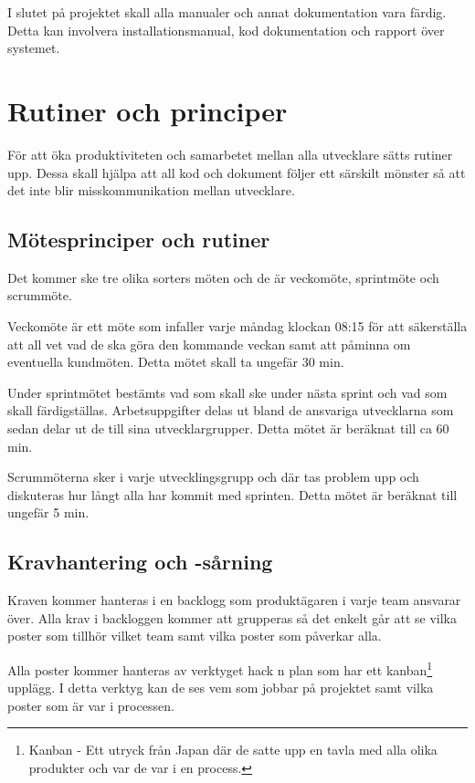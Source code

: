 \documentclass[a4paper,12pt,oneside,final]{extbook}
\begin{document}
 I slutet på projektet skall alla manualer och annat dokumentation vara färdig. Detta kan involvera installationsmanual, kod dokumentation och rapport över systemet.


\chapter{Rutiner och principer}

För att öka produktiviteten och samarbetet mellan alla utvecklare sätts rutiner upp. Dessa skall hjälpa att all kod och dokument följer ett särskilt mönster så att det inte blir misskommunikation mellan utvecklare.

\section{Mötesprinciper och rutiner}

Det kommer ske tre olika sorters möten och de är veckomöte, sprintmöte och scrummöte.  

Veckomöte är ett möte som infaller varje måndag klockan 08:15 för att säkerställa att all vet vad de ska göra den kommande veckan samt att påminna om eventuella kundmöten. Detta mötet skall ta ungefär 30 min.

Under sprintmötet bestämts vad som skall ske under nästa sprint och vad som skall färdigställas. Arbetsuppgifter delas ut bland de ansvariga utvecklarna som sedan delar ut de till sina utvecklargrupper. Detta mötet är beräknat till ca 60 min.

Scrummöterna sker i varje utvecklingsgrupp och där tas problem upp och diskuteras hur långt alla har kommit med sprinten.  Detta mötet är beräknat till ungefär 5 min.

\section{Kravhantering och -sårning}
Kraven kommer hanteras i en backlogg som produktägaren i varje team ansvarar över. Alla krav i backloggen kommer att grupperas så det enkelt går att se vilka poster som tillhör vilket team samt vilka poster som påverkar alla. 

Alla poster kommer hanteras av verktyget hack n plan som har ett kanban\footnote{Kanban - Ett utryck från Japan där de satte upp en tavla med alla olika produkter och var de var i en process.} upplägg. I detta verktyg kan de ses vem som jobbar på projektet samt vilka poster som är var i processen. 
\end{document}
